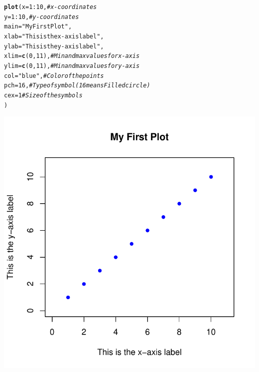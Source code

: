 \documentclass{tufte-book}\usepackage[]{graphicx}\usepackage[]{color}
\makeatletter
\def\maxwidth{ %
  \ifdim\Gin@nat@width>\linewidth
    \linewidth
  \else
    \Gin@nat@width
  \fi
}
\newcommand{\hlnum}[1]{\textcolor[rgb]{0.686,0.059,0.569}{#1}}%
\newcommand{\hlstr}[1]{\textcolor[rgb]{0.192,0.494,0.8}{#1}}%
\newcommand{\hlcom}[1]{\textcolor[rgb]{0.678,0.584,0.686}{\textit{#1}}}%
\newcommand{\hlopt}[1]{\textcolor[rgb]{0,0,0}{#1}}%
\newcommand{\hlstd}[1]{\textcolor[rgb]{0.345,0.345,0.345}{#1}}%
\newcommand{\hlkwc}[1]{\textcolor[rgb]{0.333,0.667,0.333}{#1}}%
\newcommand{\hlkwd}[1]{\textcolor[rgb]{0.737,0.353,0.396}{\textbf{#1}}}%
\newenvironment{kframe}{%
 \def\at@end@of@kframe{}%
 \ifinner\ifhmode%
  \def\at@end@of@kframe{\end{minipage}}%
  \begin{minipage}{\columnwidth}%
 \fi\fi%
 \def\FrameCommand##1{\hskip\@totalleftmargin \hskip-\fboxsep
 \colorbox{shadecolor}{##1}\hskip-\fboxsep
     \hskip-\linewidth \hskip-\@totalleftmargin \hskip\columnwidth}%
 \MakeFramed {\advance\hsize-\width
   \@totalleftmargin\z@ \linewidth\hsize
   \@setminipage}}%
 {\par\unskip\endMakeFramed%
 \at@end@of@kframe}
\newenvironment{knitrout}{}{} %
\makeatother
\begin{document}
\begin{footnotesize}
\begin{knitrout}
\color{fgcolor}\begin{kframe}
\begin{alltt}
\hlkwd{plot}\hlstd{(}\hlkwc{x} \hlstd{=} \hlnum{1}\hlopt{:}\hlnum{10}\hlstd{,} \hlcom{# x-coordinates}
     \hlkwc{y} \hlstd{=} \hlnum{1}\hlopt{:}\hlnum{10}\hlstd{,} \hlcom{# y-coordinates}
     \hlkwc{main} \hlstd{=} \hlstr{"My First Plot"}\hlstd{,}
     \hlkwc{xlab} \hlstd{=} \hlstr{"This is the x-axis label"}\hlstd{,}
     \hlkwc{ylab} \hlstd{=} \hlstr{"This is the y-axis label"}\hlstd{,}
     \hlkwc{xlim} \hlstd{=} \hlkwd{c}\hlstd{(}\hlnum{0}\hlstd{,} \hlnum{11}\hlstd{),} \hlcom{# Min and max values for x-axis}
     \hlkwc{ylim} \hlstd{=} \hlkwd{c}\hlstd{(}\hlnum{0}\hlstd{,} \hlnum{11}\hlstd{),} \hlcom{# Min and max values for y-axis}
     \hlkwc{col} \hlstd{=} \hlstr{"blue"}\hlstd{,} \hlcom{# Color of the points}
     \hlkwc{pch} \hlstd{=} \hlnum{16}\hlstd{,} \hlcom{# Type of symbol (16 means Filled circle)}
     \hlkwc{cex} \hlstd{=} \hlnum{1} \hlcom{# Size of the symbols}
     \hlstd{)}
\end{alltt}
\end{kframe}

{\centering \includegraphics[width=\maxwidth]{figure/unnamed-chunk-193-1} 

}



\end{knitrout}
\end{footnotesize}
\end{document}
